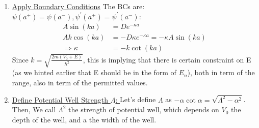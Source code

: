 \documentclass{school-22.101-notes}
\begin{document}
\begin{enumerate}
\item \uline{Apply Boundary Conditions}
The BCs are: $\psi(a^+) = \psi(a^-), \psi^{\prime}(a^+) = \psi^{\prime}(a^-)$: 
\begin{align}
A \sin (ka) &= D e^{-\kappa a } \\
A k \cos (ka) &= - D \kappa e^{-\kappa a} = - \kappa A \sin (ka) \\
\Rightarrow \kappa &= - k \cot (ka)\label{BC}
\end{align}
Since $k = \sqrt{ \frac{2 m (V_0 + E)}{\hbar^2} }$, this is implying that there is certain constraint on E (as we hinted earlier that E should be in the form of $E_n$), both in term of the range, also in term of the permitted values. 

\item \uline{Define Potential Well Strength $\Lambda$: } Let's define $\Lambda$ as $-\alpha \cot \alpha = \sqrt{\Lambda^2 - \alpha^2}$. Then,
We call $\Lambda^2$ the strength of potential well, which depends on $V_0$ the depth of the well, and a the width of the well. 


\end{enumerate}
\end{document}
